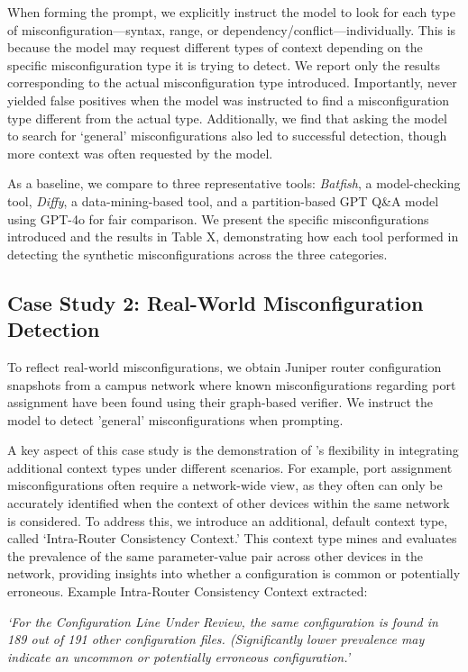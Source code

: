 When forming the prompt, we explicitly instruct the model to look for each type of misconfiguration—syntax, range, or dependency/conflict—individually. This is because the model may request different types of context depending on the specific misconfiguration type it is trying to detect. We report only the results corresponding to the actual misconfiguration type introduced. Importantly, \sysname{} never yielded false positives when the model was instructed to find a misconfiguration type different from the actual type. Additionally, we find that asking the model to search for `general' misconfigurations also led to successful detection, though more context was often requested by the model.

As a baseline, we compare \sysname{} to three representative tools: \textit{Batfish}, a model-checking tool, \textit{Diffy}, a data-mining-based tool, and a partition-based GPT Q\&A model using GPT-4o for fair comparison. We present the specific misconfigurations introduced and the results in Table X, demonstrating how each tool performed in detecting the synthetic misconfigurations across the three categories.

\subsection{Case Study 2: Real-World Misconfiguration Detection}
To reflect real-world misconfigurations, we obtain Juniper router configuration snapshots from a campus network where known misconfigurations regarding port assignment have been found using their graph-based verifier. We instruct the model to detect 'general' misconfigurations when prompting.

A key aspect of this case study is the demonstration of \sysname{}'s flexibility in integrating additional context types under different scenarios. For example, port assignment misconfigurations often require a network-wide view, as they often can only be accurately identified when the context of other devices within the same network is considered. To address this, we introduce an additional, default context type, called `Intra-Router Consistency Context.' This context type mines and evaluates the prevalence of the same parameter-value pair across other devices in the network, providing insights into whether a configuration is common or potentially erroneous.
Example Intra-Router Consistency Context extracted:

\textit{`For the Configuration Line Under Review, the same configuration is found in 189 out of 191 other configuration files. (Significantly lower prevalence may indicate an uncommon or potentially erroneous configuration.'}


